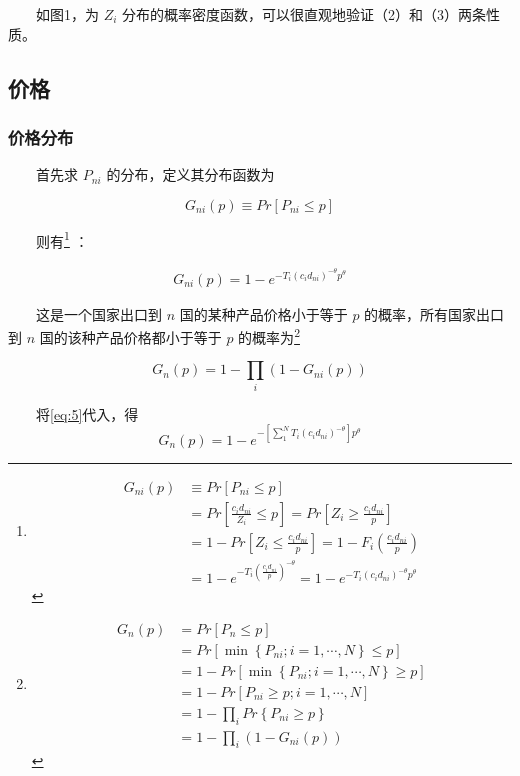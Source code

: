 \documentclass[]{article}
\let\rmarkdownfootnote\footnote%
\def\footnote{\protect\rmarkdownfootnote}
\begin{document}
　　如图1，为 \(Z_i\) 分布的概率密度函数，可以很直观地验证（2）和（3）两条性质。

\hypertarget{section-7}{%
\subsection{价格}\label{section-7}}

\hypertarget{section-8}{%
\subsubsection{价格分布}\label{section-8}}

　　首先求 \(P_{ni}\) 的分布，定义其分布函数为

\[
G_{ni}(p) \equiv Pr[P_{ni} \le p]  
\]

　　则有\footnote{\[
  \begin{aligned}
  G_{ni}(p) & \equiv Pr[P_{ni} \le p] \\  
  &= Pr[\frac {{c_i}d_{ni}}{Z_i} \le p]  = Pr[Z_i \geq \frac {{c_i}d_{ni}}{p}] \\ & = 1-Pr[Z_i \le \frac {{c_i}d_{ni}}{p}] = 1 - F_i(\frac {{c_i}d_{ni}}{p}) \\  
  &= 1 - e^{-T_{i} (\frac {{c_i}d_{ni}}{p})^{-\theta}} = 1-e^{-T_{i} ( {{c_i}d_{ni}})^{-\theta}p^{\theta}} 
  \end{aligned}
  \]} ：

\begin{align}
G_{ni}(p) =1-e^{-T_{i} ( {{c_i}d_{ni}})^{-\theta}p^{\theta}}  \label{eq:5}
\end{align}

　　这是一个国家出口到 \(n\) 国的某种产品价格小于等于 \(p\) 的概率，所有国家出口到 \(n\) 国的该种产品价格都小于等于 \(p\) 的概率为\footnote{\[
  \begin{aligned}
  G_n(p) &= Pr[P_n \le p] \\ &=Pr[ \min \left\{P_{n i} ; i=1, \cdots, N\right\} \le p] \\ &= 1 - Pr[ \min \left\{P_{n i} ; i=1, \cdots, N\right\} \geq p] \\ &= 1- Pr[ P_{n i}  \geq p; i=1, \cdots, N]\\ &=1-\prod_{i}Pr\left\{P_{ni}\geq p\right\} \\ &=1-\prod_{i}{(1-G_{ni}\left(p\right))}
  \end{aligned}
  \]}

\[
G_n(p) =1-\prod_{i}{(1-G_{ni}\left(p\right))}
\]

　　将\eqref{eq:5}代入，得 \[G_n\left(p\right)=1-e^{-[\sum_{1}^{N}T_{i} ( {{c_i}d_{ni}})^{-\theta}]p^{\theta}} \]
\end{document}
